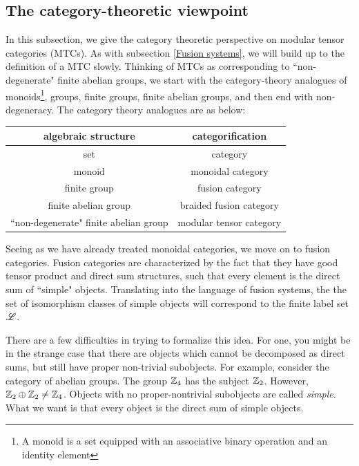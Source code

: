 \documentclass{article}
\theoremstyle{definition}
\numberwithin{figure}{section}
\begin{document}
\subsection{The category-theoretic viewpoint}
\label{Category viewpoint}

In this subsection, we give the category theoretic perspective on modular tensor categories (MTCs). As with subsection \ref{Fusion systems}, we will build up to the definition of a MTC slowly. Thinking of MTCs as corresponding to ``non-degenerate" finite abelian groups, we start with the category-theory analogues of monoids\footnote{A monoid is a set equipped with an associative binary operation and an identity element}, groups, finite groups, finite abelian groups, and then end with non-degeneracy. The category theory analogues are as below:

\begin{center}
\begin{tabular}{c || c } 
  
algebraic structure & categorification \\
\hline
\hline
set & category \\ 
 \hline
monoid & monoidal category \\
 \hline
finite group &  fusion category \\
 \hline
finite abelian group & braided fusion category \\
\hline
``non-degenerate" finite abelian group & modular tensor category
\end{tabular}
\end{center}

Seeing as we have already treated monoidal categories, we move on to fusion categories. Fusion categories are characterized by the fact that they have good tensor product and direct sum structures, such that every element is the direct sum of ``simple" objects. Translating into the language of fusion systems, the the set of isomorphism classes of simple objects will correspond to the finite label set $\mathscr{L}$.

There are a few difficulties in trying to formalize this idea. For one, you might be in the strange case that there are objects which cannot be decomposed as direct sums, but still have proper non-trivial subobjects. For example, consider the category of abelian groups. The group $\mathbb{Z}_4$ has the subject $\mathbb{Z}_2$. However, $\mathbb{Z}_2\oplus\mathbb{Z}_2\neq \mathbb{Z}_4$. Objects with no proper-nontrivial subobjects are called \textit{simple}. What we want is that every object is the direct sum of simple objects.
\end{document}
